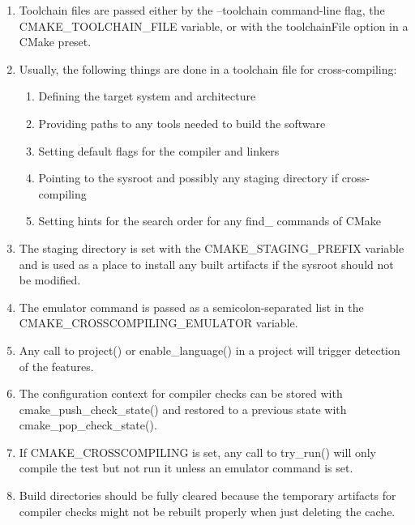 

\begin{enumerate}
\item 
Toolchain files are passed either by the --toolchain command-line flag, the CMAKE\_TOOLCHAIN\_FILE variable, or with the toolchainFile option in a CMake preset.

\item
Usually, the following things are done in a toolchain file for cross-compiling:

\begin{enumerate}[label=\Alph*]
\item
Defining the target system and architecture
 
\item 
Providing paths to any tools needed to build the software

\item 
Setting default flags for the compiler and linkers

\item 
Pointing to the sysroot and possibly any staging directory if cross-compiling

\item 
Setting hints for the search order for any find\_ commands of CMake
\end{enumerate}

\item 
The staging directory is set with the CMAKE\_STAGING\_PREFIX variable and is used as a place to install any built artifacts if the sysroot should not be modified.

\item 
The emulator command is passed as a semicolon-separated list in the CMAKE\_CROSSCOMPILING\_EMULATOR variable.

\item 
Any call to project() or enable\_language() in a project will trigger
detection of the features.

\item 
The configuration context for compiler checks can be stored with cmake\_push\_check\_state() and restored to a previous state with cmake\_pop\_check\_state().

\item 
If CMAKE\_CROSSCOMPILING is set, any call to try\_run() will only compile the test but not run it unless an emulator command is set.

\item 
Build directories should be fully cleared because the temporary artifacts for compiler checks might not be rebuilt properly when just deleting the cache.
\end{enumerate}